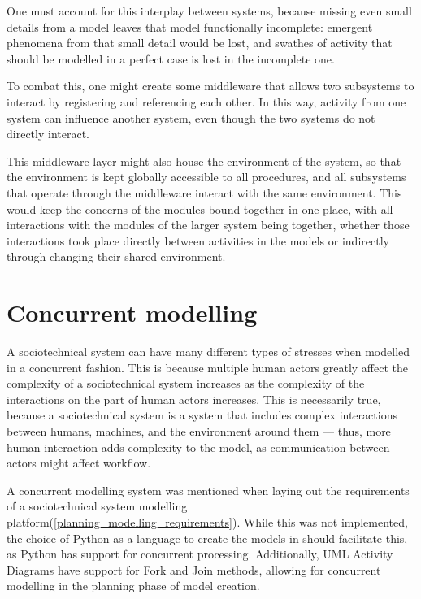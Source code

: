 One must account for this interplay between systems, because missing even small details from a model leaves that model functionally incomplete: emergent phenomena from that small detail would be lost, and swathes of activity that should be modelled in a perfect case is lost in the incomplete one. \par

To combat this, one might create some middleware that allows two subsystems to interact by registering and referencing each other. In this way, activity from one system can influence another system, even though the two systems do not directly interact. \par

This middleware layer might also house the environment of the system, so that the environment is kept globally accessible to all procedures, and all subsystems that operate through the middleware interact with the same environment. This would keep the concerns of the modules bound together in one place, with all interactions with the modules of the larger system being together, whether those interactions took place directly between activities in the models or indirectly through changing their shared environment. \par

\section{Concurrent modelling}
\label{concurrent_modelling}
A sociotechnical system can have many different types of stresses when modelled in a concurrent fashion. This is because multiple human actors greatly affect the complexity of a sociotechnical system increases as the complexity of the interactions on the part of human actors increases. This is necessarily true, because a sociotechnical system is a system that includes complex interactions between humans, machines, and the environment around them\cite{Baxter2011} --- thus, more human interaction adds complexity to the model, as communication between actors might affect workflow. \par%

A concurrent modelling system was mentioned when laying out the requirements of a sociotechnical system modelling platform(\cref{planning_modelling_requirements}). While this was not implemented, the choice of Python as a language to create the models in should facilitate this, as Python has support for concurrent processing\cite{16.2.58:online}. Additionally, UML Activity Diagrams have support for Fork and Join methods\cite{Omg2010}, allowing for concurrent modelling in the planning phase of model creation. \par%

